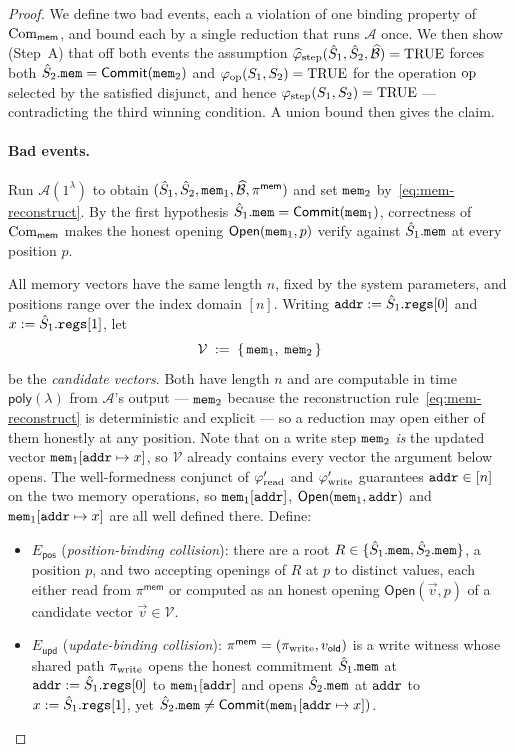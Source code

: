 \begin{proof}
We define two bad events, each a violation of one binding property of
$\mathrm{Com}_{\mathsf{mem}}$, and bound each by a single reduction that runs
$\mathcal{A}$ once. We then show (Step~A) that off both events the assumption
$\widehat{\varphi}_{\mathrm{step}}(\hat{S}_1,\hat{S}_2,\widehat{\mathcal{B}})=\mathrm{TRUE}$
forces both $\hat{S}_2.\mathtt{mem}=\mathsf{Commit}(\mathtt{mem}_2)$ and
$\varphi_{\mathrm{op}}(S_1,S_2)=\mathrm{TRUE}$ for the operation $\mathrm{op}$ selected by
the satisfied disjunct, and hence $\varphi_{\mathrm{step}}(S_1,S_2)=\mathrm{TRUE}$ ---
contradicting the third winning condition. A union bound then gives the claim.

\paragraph{Bad events.}
Run $\mathcal{A}(1^\lambda)$ to obtain
$(\hat{S}_1,\hat{S}_2,\mathtt{mem}_1,\widehat{\mathcal{B}},\pi^{\mathsf{mem}})$ and set $\mathtt{mem}_2$
by~\eqref{eq:mem-reconstruct}. By the first hypothesis
$\hat{S}_1.\mathtt{mem}=\mathsf{Commit}(\mathtt{mem}_1)$, correctness of
$\mathrm{Com}_{\mathsf{mem}}$ makes the honest opening $\mathsf{Open}(\mathtt{mem}_1,p)$ verify
against $\hat{S}_1.\mathtt{mem}$ at every position $p$.

All memory vectors have the same length $n$, fixed by the system parameters,
and positions range over the index domain $[n]$.  Writing
$\mathtt{addr}:=\hat{S}_1.\mathtt{regs}[0]$ and $x:=\hat{S}_1.\mathtt{regs}[1]$, let
\[
  \mathcal{V}\;:=\;\{\,\mathtt{mem}_1,\;\mathtt{mem}_2\,\}
\]
be the \emph{candidate vectors}.  Both have length $n$ and are computable in
time $\mathsf{poly}(\lambda)$ from $\mathcal{A}$'s output --- $\mathtt{mem}_2$ because
the reconstruction rule~\eqref{eq:mem-reconstruct} is deterministic and
explicit --- so a reduction may open either of them honestly at any position.
Note that on a write step $\mathtt{mem}_2$ \emph{is} the updated vector
$\mathtt{mem}_1[\mathtt{addr}\mapsto x]$, so $\mathcal{V}$ already contains every vector the
argument below opens.  The well-formedness conjunct of $\varphi'_{\mathrm{read}}$ and
$\varphi'_{\mathrm{write}}$ guarantees $\mathtt{addr}\in[n]$ on the two memory operations, so
$\mathtt{mem}_1[\mathtt{addr}]$, $\mathsf{Open}(\mathtt{mem}_1,\mathtt{addr})$ and $\mathtt{mem}_1[\mathtt{addr}\mapsto x]$ are
all well defined there.  Define:
\begin{itemize}
  \item $E_{\mathsf{pos}}$ (\emph{position-binding collision}): there are a root
    $R\in\{\hat{S}_1.\mathtt{mem},\hat{S}_2.\mathtt{mem}\}$, a position $p$, and two accepting
    openings of $R$ at $p$ to distinct values, each either read from
    $\pi^{\mathsf{mem}}$ or computed as an honest opening $\mathsf{Open}(\vec{v},p)$
    of a candidate vector $\vec{v}\in\mathcal{V}$.
  \item $E_{\mathsf{upd}}$ (\emph{update-binding collision}):
    $\pi^{\mathsf{mem}}=(\pi_{\mathrm{write}},v_{\mathsf{old}})$ is a write witness whose
    shared path $\pi_{\mathrm{write}}$ opens the honest commitment $\hat{S}_1.\mathtt{mem}$ at
    $\mathtt{addr}:=\hat{S}_1.\mathtt{regs}[0]$ to $\mathtt{mem}_1[\mathtt{addr}]$ and opens $\hat{S}_2.\mathtt{mem}$ at
    $\mathtt{addr}$ to $x:=\hat{S}_1.\mathtt{regs}[1]$, yet
    $\hat{S}_2.\mathtt{mem}\neq\mathsf{Commit}(\mathtt{mem}_1[\mathtt{addr}\mapsto x])$.
\end{itemize}


\end{proof}
